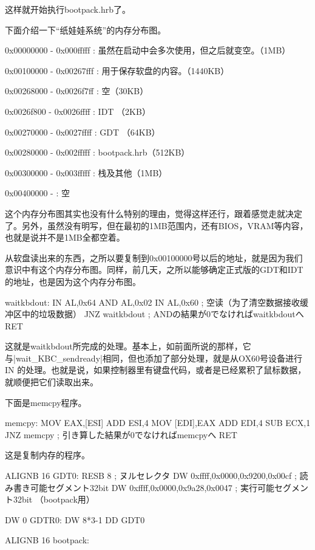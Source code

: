 这样就开始执行bootpack.hrb了。

\cs

下面介绍一下“纸娃娃系统”的内存分布图。

0x00000000 - 0x000fffff : 虽然在启动中会多次使用，但之后就变空。（1MB）

0x00100000 - 0x00267fff : 用于保存软盘的内容。（1440KB）

0x00268000 - 0x0026f7ff : 空（30KB）

0x0026f800 - 0x0026ffff : IDT （2KB）

0x00270000 - 0x0027ffff : GDT （64KB）

0x00280000 - 0x002fffff : bootpack.hrb（512KB）

0x00300000 - 0x003fffff : 栈及其他（1MB）

0x00400000 - : 空

这个内存分布图其实也没有什么特别的理由，觉得这样还行，跟着感觉走就决定了。另外，虽然没有明写，但在最初的1MB范围内，还有BIOS，VRAM等内容，也就是说并不是1MB全都空着。

从软盘读出来的东西，之所以要复制到0x00100000号以后的地址，就是因为我们意识中有这个内存分布图。同样，前几天，之所以能够确定正式版的GDT和IDT的地址，也是因为这个内存分布图。

\cs

\begin{code}[label=asmhead.nas节选（续）]
waitkbdout:
		IN		 AL,0x64
		AND		 AL,0x02
        IN       AL,0x60        ; 空读（为了清空数据接收缓冲区中的垃圾数据）
		JNZ		waitkbdout		; ANDの結果が0でなければwaitkbdoutへ
		RET
\end{code}

这就是waitkbdout所完成的处理。基本上，如前面所说的那样，它与|wait_KBC_sendready|相同，但也添加了部分处理，就是从OX60号设备进行IN 的处理。也就是说，如果控制器里有键盘代码，或者是已经累积了鼠标数据，就顺便把它们读取出来。

\cs

下面是memcpy程序。

\begin{code}[label=asmhead.nas节选（续）]
memcpy:
		MOV		EAX,[ESI]
		ADD		ESI,4
		MOV		[EDI],EAX
		ADD		EDI,4
		SUB		ECX,1
		JNZ		memcpy			; 引き算した結果が0でなければmemcpyへ
		RET
\end{code}

这是复制内存的程序。

\cs

\begin{code}[label=asmhead.nas节选（续）]
		ALIGNB	16
GDT0:
		RESB	8				; ヌルセレクタ
		DW		0xffff,0x0000,0x9200,0x00cf	; 読み書き可能セグメント32bit
		DW		0xffff,0x0000,0x9a28,0x0047	; 実行可能セグメント32bit （bootpack用）

		DW		0
GDTR0:
		DW		8*3-1
		DD		GDT0

		ALIGNB	16
bootpack:
\end{code}

